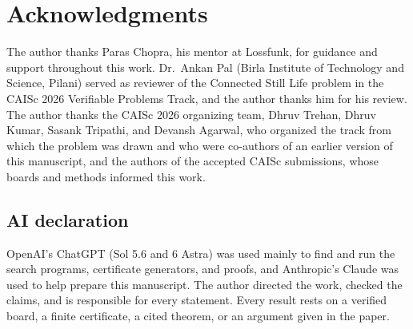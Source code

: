 \documentclass[10pt]{article}
\theoremstyle{remark}
\begin{document}
\section*{Acknowledgments}

The author thanks Paras Chopra, his mentor at Lossfunk, for guidance and support
throughout this work.  Dr.~Ankan Pal (Birla Institute of Technology and
Science, Pilani) served as reviewer of the Connected Still Life problem in the
CAISc 2026 Verifiable Problems Track, and the author thanks him for his review.
The author thanks the CAISc 2026 organizing team, Dhruv Trehan, Dhruv Kumar,
Sasank Tripathi, and Devansh Agarwal, who organized the track from which the
problem was drawn and who were co-authors of an earlier version of this
manuscript, and the authors of the accepted CAISc submissions, whose boards and
methods informed this work.

\subsection*{AI declaration}

OpenAI's ChatGPT (Sol 5.6 and 6 Astra) was used mainly to find and run the
search programs, certificate generators, and proofs, and Anthropic's Claude was
used to help prepare this manuscript.  The author directed the work, checked the
claims, and is responsible for every statement.  Every result rests on a
verified board, a finite certificate, a cited theorem, or an argument given in
the paper.
\end{document}
